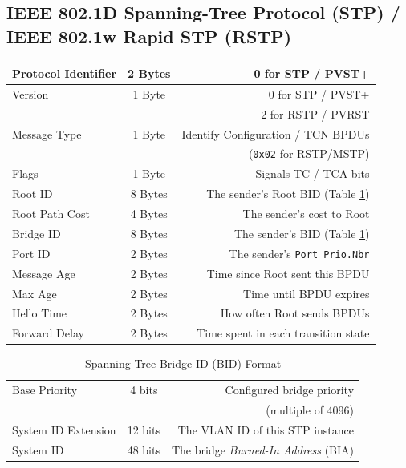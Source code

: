 \documentclass[12pt]{article}
\begin{document}
	\subsection[IEEE 802.1D STP / IEEE 802.1w RSTP]{IEEE 802.1D Spanning-Tree Protocol (STP) /\\IEEE 802.1w Rapid STP (RSTP) \label{subsec:802.1D/w}}
	\begin{table}[H]
	\centering
	\begin{tabular}{| l | c | r |}
	\hline
	Protocol Identifier		& 2 Bytes	& 0 for STP / PVST+\\\hline
	Version			& 1 Byte	& 0 for STP / PVST+\\
					&		& 2 for RSTP / PVRST\\\hline
	Message Type		& 1 Byte	& Identify Configuration / TCN BPDUs\\
					&		& (\texttt{0x02} for RSTP/MSTP)\\\hline
	Flags				& 1 Byte	& Signals TC / TCA bits\\\hline
	Root ID			& 8 Bytes	& The sender's Root BID (Table \ref{tab:BID})\\\hline
	Root Path Cost		& 4 Bytes	& The sender's cost to Root\\\hline
	Bridge ID			& 8 Bytes	& The sender's BID (Table \ref{tab:BID})\\\hline
	Port ID			& 2 Bytes	& The sender's \texttt{Port Prio.Nbr}\\\hline
	Message Age		& 2 Bytes	& Time since Root sent this BPDU\\\hline
	Max Age			& 2 Bytes	& Time until BPDU expires\\\hline
	Hello Time			& 2 Bytes	& How often Root sends BPDUs\\\hline
	Forward Delay		& 2 Bytes	& Time spent in each transition state\\\hline
	\end{tabular}\end{table}

	\begin{table}[H]
	\centering
	\caption{Spanning Tree Bridge ID (BID) Format \label{tab:BID}}
	\begin{tabular}{| l | c | r |}
	\hline
	Base Priority		& 4 bits	& Configured bridge priority\\
					&		& (multiple of 4096)\\\hline
	System ID Extension	& 12 bits	& The VLAN ID of this STP instance\\\hline
	System ID			& 48 bits	& The bridge \textit{Burned-In Address} (BIA)\\\hline
	\end{tabular}\end{table}
\end{document}
